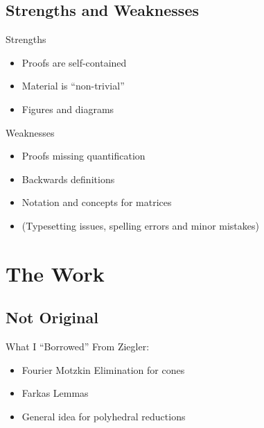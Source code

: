 \documentclass{beamer}
\begin{document}
\subsection{Strengths and Weaknesses}

\begin{frame}{Strengths}
\begin{itemize}
  \item<1-> Proofs are self-contained
  \item<2-> Material is ``non-trivial''
  \item<3-> Figures and diagrams
\end{itemize}
\end{frame}

\begin{frame}{Weaknesses}
\begin{itemize}
  \item<1-> Proofs missing quantification
  \item<2-> Backwards definitions
  \item<3-> Notation and concepts for matrices
  \item<4-> (Typesetting issues, spelling errors and minor mistakes)
\end{itemize}
\end{frame}

\section{The Work}

\subsection{Not Original}

\newcommand{\UCone}{\{U\t \st \t \geq \0\}}
\newcommand{\TUCone}{\pmb \0 & -I \\ I & -U \\ -I & U \pme}

\begin{frame}{What I ``Borrowed''}
From Ziegler:
\begin{itemize}
  \item<1-> Fourier Motzkin Elimination for cones
  \item<2-> Farkas Lemmas
  \item<3-> General idea for polyhedral reductions
\end{itemize}
\end{frame}
\end{document}
